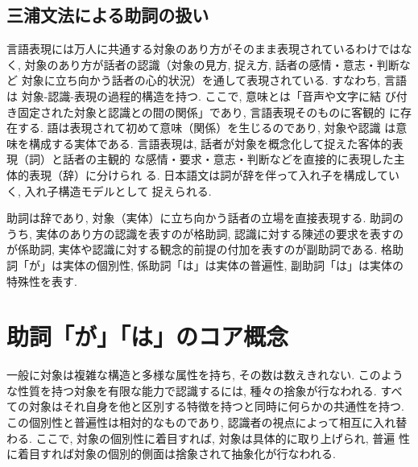 \subsection{三浦文法による助詞の扱い}
言語表現には万人に共通する対象のあり方がそのまま表現されているわけではなく, 
対象のあり方が話者の認識（対象の見方, 捉え方, 話者の感情・意志・判断など
対象に立ち向かう話者の心的状況）を通して表現されている. すなわち, 言語は
対象-認識-表現の過程的構造を持つ. ここで, 意味とは「音声や文字に結
び付き固定された対象と認識との間の関係」であり, 言語表現そのものに客観的
に存在する. 語は表現されて初めて意味（関係）を生じるのであり, 対象や認識
は意味を構成する実体である. 
 言語表現は, 話者が対象を概念化して捉えた客体的表現（詞）と話者の主観的
な感情・要求・意志・判断などを直接的に表現した主体的表現（辞）に分けられ
る. 日本語文は詞が辞を伴って入れ子を構成していく, 入れ子構造モデルとして
捉えられる. 

助詞は辞であり, 対象（実体）に立ち向かう話者の立場を直接表現する. 助詞の
うち, 実体のあり方の認識を表すのが格助詞, 認識に対する陳述の要求を表すの
が係助詞, 実体や認識に対する観念的前提の付加を表すのが副助詞である. 格助
詞「が」は実体の個別性, 係助詞「は」は実体の普遍性, 副助詞「は」は実体の
特殊性を表す. 

\vspace*{-0.5mm}
\section{助詞「が」「は」のコア概念}
\vspace*{-0.5mm}
一般に対象は複雑な構造と多様な属性を持ち, その数は数えきれない. このよう
な性質を持つ対象を有限な能力で認識するには, 種々の捨象が行なわれる. すべ
ての対象はそれ自身を他と区別する特徴を持つと同時に何らかの共通性を持つ. 
この個別性と普遍性は相対的なものであり, 認識者の視点によって相互に入れ替
わる. ここで, 対象の個別性に着目すれば, 対象は具体的に取り上げられ, 普遍
性に着目すれば対象の個別的側面は捨象されて抽象化が行なわれる. 

